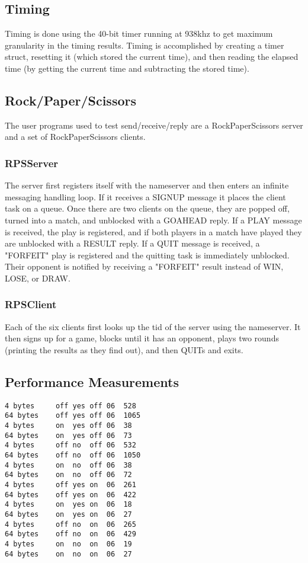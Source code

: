 \documentclass{article}
\begin{document}
\subsection{Timing}

Timing is done using the 40-bit timer running at 938khz to get maximum granularity in the timing results. Timing is accomplished by creating a timer struct, resetting it (which stored the current time), and then reading the elapsed time (by getting the current time and subtracting the stored time).

\subsection{Rock/Paper/Scissors}
The user programs used to test send/receive/reply are a RockPaperScissors server and a set of RockPaperScissors clients. 

\subsubsection{RPSServer}
The server first registers itself with the nameserver and then enters an infinite messaging handling loop.
If it receives a SIGNUP message it places the client task on a queue. Once there are two clients on the queue, they are popped off, turned into a match, and unblocked with a GOAHEAD reply.
If a PLAY message is received, the play is registered, and if both players in a match have played they are unblocked with a RESULT reply.
If a QUIT message is received, a "FORFEIT" play is registered and the quitting task is immediately unblocked. Their opponent is notified by receiving a "FORFEIT" result instead of WIN, LOSE, or DRAW.

\subsubsection{RPSClient}
Each of the six clients first looks up the tid of the server using the nameserver. It then signs up for a game, blocks until it has an opponent, plays two rounds (printing the results as they find out), and then QUITs and exits.

\subsection{Performance Measurements}
\begin{verbatim}
4 bytes		off	yes	off	06	528
64 bytes	off	yes	off	06	1065
4 bytes		on	yes	off	06	38
64 bytes	on	yes	off	06	73
4 bytes		off	no	off	06	532
64 bytes	off	no	off	06	1050
4 bytes		on	no	off	06	38
64 bytes	on	no	off	06	72
4 bytes		off	yes	on	06	261
64 bytes	off	yes	on	06	422
4 bytes		on	yes	on	06	18
64 bytes	on	yes	on	06	27
4 bytes		off	no	on	06	265
64 bytes	off	no	on	06	429
4 bytes		on	no	on	06	19
64 bytes	on	no	on	06	27
\end{verbatim}
\end{document}
